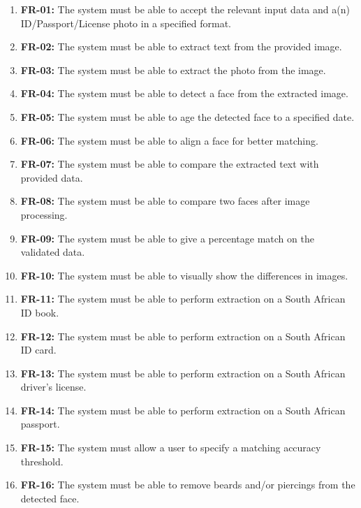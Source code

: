 \documentclass{article}
\begin{document}
		\begin{enumerate}
		    \item \textbf{FR-01:} The system must be able to accept the relevant input data and a(n) ID/Passport/License photo in a specified format.
		    \item \textbf{FR-02:} The system must be able to extract text from the provided image.
		    \item \textbf{FR-03:} The system must be able to extract the photo from the image.
		    \item \textbf{FR-04:} The system must be able to detect a face from the extracted image.
		    \item \textbf{FR-05:} The system must be able to age the detected face to a specified date.
		    \item \textbf{FR-06:} The system must be able to align a face for better matching.
		    \item \textbf{FR-07:} The system must be able to compare the extracted text with provided data.
		    \item \textbf{FR-08:} The system must be able to compare two faces after image processing.
		    \item \textbf{FR-09:} The system must be able to give a percentage match on the validated data.
		    \item \textbf{FR-10:} The system must be able to visually show the differences in images.
		    \item \textbf{FR-11:} The system must be able to perform extraction on a South African ID book.
		    \item \textbf{FR-12:} The system must be able to perform extraction on a South African ID card.
		    \item \textbf{FR-13:} The system must be able to perform extraction on a South African driver's license.
		    \item \textbf{FR-14:} The system must be able to perform extraction on a South African passport.
		    \item \textbf{FR-15:} The system must allow a user to specify a matching accuracy threshold.
		    \item \textbf{FR-16:} The system must be able to remove beards and/or piercings from the detected face.
		    
		\end{enumerate}
		
		
\end{document}
